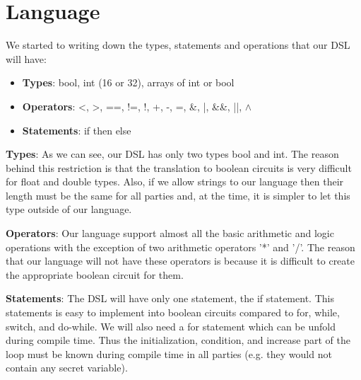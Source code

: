 \documentclass[paper=a4, fontsize=11pt]{scrartcl} %
\numberwithin{equation}{section} %
\numberwithin{figure}{section} %
\numberwithin{table}{section} %
\begin{document}
\section{Language}
We started to writing down the types, statements and operations that our DSL will have:
\begin{itemize}
\item \textbf{Types}: bool, int (16 or 32), arrays of int or bool
\item \textbf{Operators}: <, >, ==, !=, !, +, -, =, \&, |, \&\&, ||, $\wedge$
\item \textbf{Statements}: if then else
\end{itemize}

\noindent
\textbf{Types}:
As we can see, our DSL has only two types bool and int. The reason behind this restriction is that the translation to boolean circuits is very difficult for float and double types. Also, if we allow strings to our language then their length must be the same for all parties and, at the time, it is simpler to let this type outside of our language.

\textbf{Operators}: Our language support almost all the basic arithmetic and 
logic operations with the exception of two arithmetic operators '*' and '/'. The reason that our language will not have these operators is because it is difficult to create the appropriate boolean circuit for them.

\textbf{Statements}: The DSL will have only one statement, the if statement. This statements is easy to implement into boolean circuits compared to for, while, switch, and do-while. We will also need a for statement which can be unfold during compile time. Thus the initialization, condition, and increase part of the loop must be known during compile time in all parties (e.g. they would not contain any secret variable).
\end{document}
